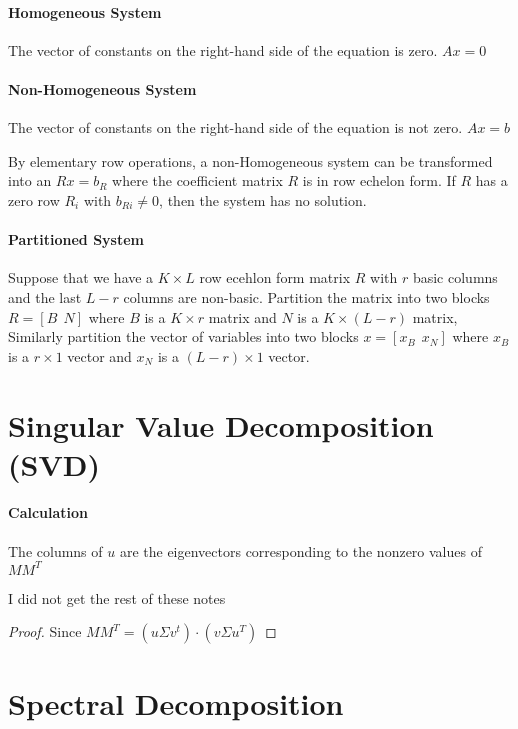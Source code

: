 \documentclass{article}
\theoremstyle{definition}
\theoremstyle{remark}
\begin{document}
\paragraph{Homogeneous System} 

The vector of constants on the right-hand side of the equation is zero. $Ax = 0$

\paragraph{Non-Homogeneous System}

The vector of constants on the right-hand side of the equation is not zero. $Ax = b$

By elementary row operations, a non-Homogeneous system can be transformed into an $Rx = b_R$ where the coefficient matrix $R$ is in row echelon form. If $R$ has a zero row $R_i$ with $b_{Ri} \neq 0$, then the system has no solution. 

\paragraph{Partitioned System}

Suppose that we have a $K \times L$ row ecehlon form matrix $R$ with $r$ basic columns and the last $L - r$ columns are non-basic. Partition the matrix into two blocks $R = [B~~N]$ where $B$ is a $K \times r$ matrix and $N$ is a $K \times (L-r)$ matrix, Similarly partition the vector of variables into two blocks $x = [x_B~~x_N]$ where $x_B$ is a $r \times 1$ vector and $x_N$ is a $(L-r) \times 1$ vector.

\section{Singular Value Decomposition (SVD)}

\paragraph{Calculation}
The columns of $u$ are the eigenvectors corresponding to the nonzero values of $MM^T$ 

I did not get the rest of these notes

\begin{proof}
    Since $MM^T = (u\Sigma v^t)\cdot(v \Sigma u^T)$ 
\end{proof}

\section{Spectral Decomposition}
\end{document}
